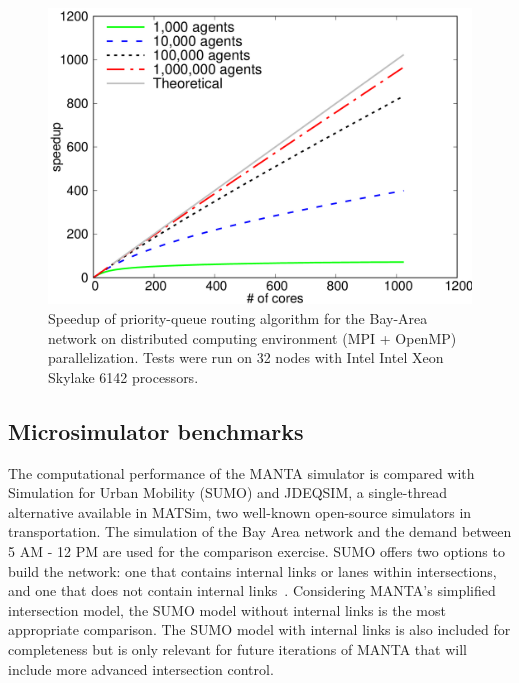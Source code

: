 \documentclass[final]{IEEEtran}
\begin{document}
\begin{figure}
    \centering
    \includegraphics[width=\linewidth]{figs/speedup.png}
    \caption{Speedup of priority-queue routing algorithm for the Bay-Area network on distributed computing environment (MPI + OpenMP) parallelization. Tests were run on 32 nodes with Intel Intel Xeon Skylake 6142 processors.}
    \label{fig:speedup}
\end{figure}




\subsection{Microsimulator benchmarks}

The computational performance of the MANTA simulator is compared with Simulation for Urban Mobility (SUMO) and JDEQSIM, a single-thread alternative available in MATSim, two well-known open-source simulators in transportation. The simulation of the Bay Area network and the demand between 5 AM - 12 PM are used for the comparison exercise. SUMO offers two options to build the network: one that contains internal links or lanes within intersections, and one that does not contain internal links~\cite{dlr46740}. Considering MANTA's simplified intersection model, the SUMO model without internal links is the most appropriate comparison. The SUMO model with internal links is also included for completeness but is only relevant for future iterations of MANTA that will include more advanced intersection control.
\end{document}
